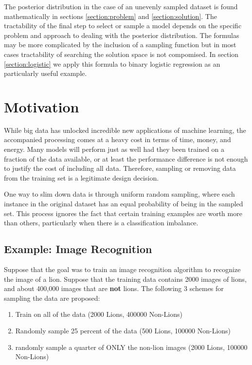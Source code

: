\documentclass[twoside]{article}
\begin{document}
The posterior distribution in the case of an unevenly sampled dataset is found mathematically in sections \ref{section:problem} and \ref{section:solution}. The tractability of the final step to select or sample a model depends on the specific problem and approach to dealing with the posterior distribution. The formulas may be more complicated by the inclusion of a sampling function but in most cases tractability of searching the solution space is not compomised. In section \ref{section:logistic} we apply this formula to binary logistic regression as an particularly useful example.

\section{Motivation}

While big data has unlocked incredible new applications of machine learning, the accompanied processing comes at a heavy cost in terms of time, money, and energy. Many models will perform just as well had they been trained on a fraction of the data available, or at least the performance difference is not enough to justify the cost of including all data. Therefore, sampling or removing data from the training set is a legitimate design decision.

One way to slim down data is through uniform random sampling, where each instance in the original dataset has an equal probability of being in the sampled set. This process ignores the fact that certain training examples are worth more than others, particularly when there is a classification imbalance.

\subsection{Example: Image Recognition}

Suppose that the goal was to train an image recognition algorithm to recognize the image of a lion. Suppose that the training data contains 2000 images of lions, and about 400,000 images that are \textbf{not} lions. The following 3 schemes for sampling the data are proposed:

\begin{enumerate}[label=\Alph*]
\item Train on all of the data (2000 Lions, 400000 Non-Lions)
\item Randomly sample 25 percent of the data (500 Lions, 100000 Non-Lions)
\item  randomly sample a quarter of ONLY the non-lion images (2000 Lions, 100000 Non-Lions)
\end{enumerate}
\end{document}
